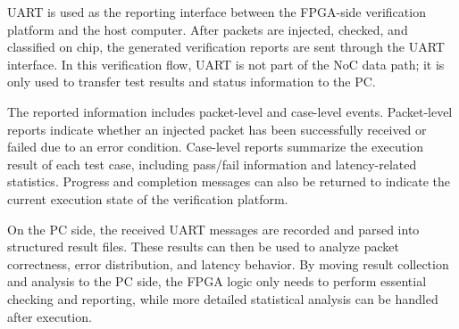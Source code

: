 UART is used as the reporting interface between the FPGA-side verification platform and the host computer. After packets are injected, checked, and classified on chip, the generated verification reports are sent through the UART interface. In this verification flow, UART is not part of the NoC data path; it is only used to transfer test results and status information to the PC.

The reported information includes packet-level and case-level events. Packet-level reports indicate whether an injected packet has been successfully received or failed due to an error condition. Case-level reports summarize the execution result of each test case, including pass/fail information and latency-related statistics. Progress and completion messages can also be returned to indicate the current execution state of the verification platform.

On the PC side, the received UART messages are recorded and parsed into structured result files. These results can then be used to analyze packet correctness, error distribution, and latency behavior. By moving result collection and analysis to the PC side, the FPGA logic only needs to perform essential checking and reporting, while more detailed statistical analysis can be handled after execution.
